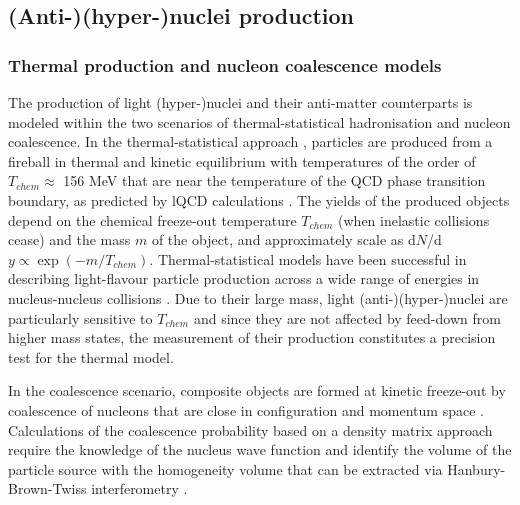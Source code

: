 \subsection{(Anti-)(hyper-)nuclei production} 
\subsubsection{Thermal production and nucleon coalescence models}
\label{sec:producionmodels}

The production of light (hyper-)nuclei and their anti-matter counterparts is modeled within the two scenarios of thermal-statistical hadronisation and nucleon coalescence.
In the thermal-statistical approach \cite{Andronic:2010qu, Andronic:2017}, particles are produced from a fireball in thermal and kinetic equilibrium with temperatures of the order of $T_{chem} \approx$ 156 MeV that are near the temperature of the QCD phase transition boundary, as predicted by lQCD calculations \cite{Bazavov:2014pvz,Bellwied:2013cta}.
The yields of the produced objects depend on the chemical freeze-out temperature $T_{chem}$ (when inelastic collisions cease) and the mass $m$ of the object, and approximately scale as d$N$/d$y \propto \exp(-m/T_{chem})$.  
Thermal-statistical models have been successful in describing light-flavour particle production across a wide range of energies in nucleus-nucleus collisions \cite{Andronic:2017, Acharya:2017bso}.  
Due to their large mass, light (anti-)(hyper-)nuclei are particularly sensitive to $T_{chem}$ and since they are not affected by feed-down from higher mass states, the measurement of their production constitutes a precision test for the thermal model.  

In the coalescence scenario, composite objects are formed at kinetic freeze-out by coalescence of nucleons that are close in configuration and momentum space \cite{Butler:1963, Kapusta:1980, Bergstrom:1979gpv, Sato:1981ez, Nagle:1996vp, Scheibl:1998tk}. Calculations of the coalescence probability based on a density matrix approach \cite{Scheibl:1998tk} require the knowledge of the nucleus wave function and identify the volume of the particle source with the homogeneity volume that can be extracted via Hanbury-Brown-Twiss interferometry \cite{Wiedemann:1999qn}. 

